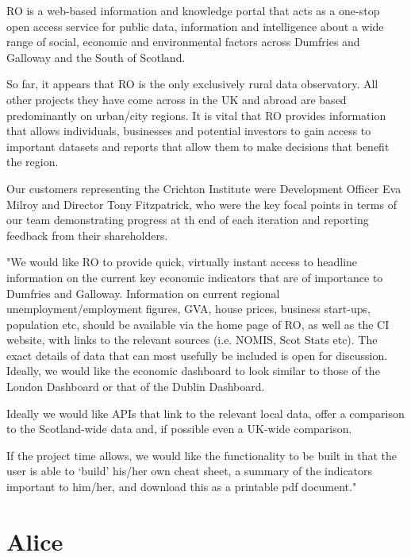 \documentclass{l3proj}
\begin{document}
RO is a web-based information and knowledge portal that acts as a one-stop open access service for public data, information and
intelligence about a wide range of social, economic and environmental factors across Dumfries and Galloway and the South of Scotland.

So far, it appears that RO is the only exclusively rural data observatory. All other projects they have come across in the UK and abroad
are based predominantly on urban/city regions. It is vital that RO provides information that allows individuals, businesses and potential
investors to gain access to important datasets and reports that allow them to make decisions that benefit the region.

Our customers representing the Crichton Institute were Development Officer Eva Milroy and Director Tony Fitzpatrick, who were the key
focal points in terms of our team demonstrating progress at th end of each iteration and reporting feedback from their shareholders.


"We would like RO to provide quick, virtually instant access to headline information on the current key economic indicators that are of
importance to Dumfries and Galloway. Information on current regional unemployment/employment figures, GVA, house prices, business start-ups,
population etc, should be available via the home page of RO, as well as the CI website, with links to the relevant sources
(i.e. NOMIS, Scot Stats etc). The exact details of data that can most usefully be included is open for discussion. Ideally, we would like
the economic dashboard to look similar to those of the London Dashboard or that of the Dublin Dashboard.

Ideally we would like APIs that link to the relevant local data, offer a comparison to the Scotland-wide data and,
if possible even a UK-wide comparison.

If the project time allows, we would like the functionality to be built in that the user is able to ‘build’ his/her own cheat sheet,
a summary of the indicators important to him/her, and download this as a printable pdf document."


\section{Alice}
\end{document}
